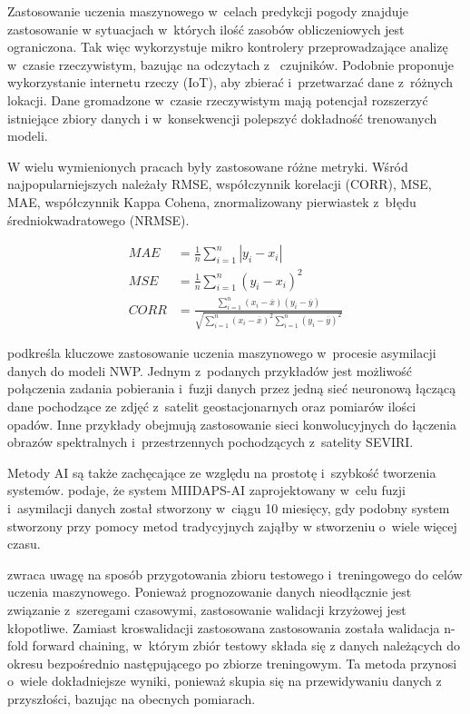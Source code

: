 Zastosowanie uczenia maszynowego w~celach predykcji pogody znajduje zastosowanie
w sytuacjach w~których ilość zasobów obliczeniowych jest ograniczona. Tak więc
\cite{weather-forecasting-using-ml} wykorzystuje
mikro kontrolery przeprowadzające analizę w~czasie rzeczywistym, bazując na odczytach z~
czujników. Podobnie \cite{smart-weather-forecasting}
proponuje wykorzystanie internetu rzeczy (IoT), aby zbierać i~przetwarzać dane z~różnych lokacji.
Dane gromadzone w~czasie rzeczywistym mają potencjał rozszerzyć istniejące zbiory danych
i w~konsekwencji polepszyć dokładność trenowanych modeli.

W wielu wymienionych pracach \cite{development-and-application-of-ml-in}
były zastosowane różne metryki. Wśród najpopularniejszych
należały RMSE, współczynnik korelacji (CORR), MSE, MAE, współczynnik Kappa Cohena,
znormalizowany pierwiastek z~błędu średniokwadratowego (NRMSE).

\begin{align*}
    MAE &= \frac{1}{n}\sum_{i=1}^n |y_i - x_i|\\
    MSE &= \frac{1}{n}\sum_{i=1}^n (y_i-x_i)^2\\
    CORR &= \frac{\sum_{i=1}^n (x_i-\overline{x})(y_i-\overline{y})}
    {\sqrt{\sum_{i=1}^n (x_i-\overline{x})^2\sum_{i=1}^n (y_i-\overline{y})^2}}
\end{align*}

\cite{ai-revolutionises-weather-prediction}
podkreśla kluczowe zastosowanie uczenia maszynowego w~procesie asymilacji danych do modeli NWP.
Jednym z~podanych przykładów jest możliwość połączenia zadania pobierania i~fuzji danych 
przez jedną sieć neuronową łączącą dane pochodzące ze zdjęć z~satelit geostacjonarnych oraz 
pomiarów ilości opadów. Inne przykłady obejmują zastosowanie sieci konwolucyjnych do łączenia
obrazów spektralnych i~przestrzennych pochodzących z~satelity SEVIRI. 

Metody AI są także zachęcające ze względu na prostotę i~szybkość tworzenia systemów.
\cite{ai-revolutionises-weather-prediction}
podaje, że system MIIDAPS-AI zaprojektowany w~celu fuzji i~asymilacji danych został stworzony w~ciągu 10 miesięcy, 
gdy podobny system stworzony przy pomocy metod tradycyjnych zająłby
w stworzeniu o~wiele więcej czasu.

\cite{ml-applied-to-weather-forecasting}
zwraca uwagę na sposób przygotowania zbioru testowego i~treningowego do celów uczenia 
maszynowego. Ponieważ prognozowanie danych nieodłącznie jest związanie z~szeregami czasowymi,
zastosowanie walidacji krzyżowej jest kłopotliwe. Zamiast kroswalidacji zastosowana 
zastosowania została walidacja n-fold forward chaining, w~którym zbiór testowy składa się 
z danych należących do okresu bezpośrednio następującego po zbiorze treningowym. Ta metoda
przynosi o~wiele dokładniejsze wyniki, ponieważ skupia się na przewidywaniu danych 
z przyszłości, bazując na obecnych pomiarach.

